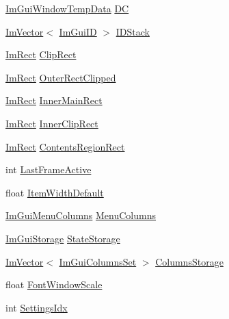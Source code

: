 \begin{DoxyCompactItemize}
\item 
\mbox{\hyperlink{struct_im_gui_window_temp_data}{Im\+Gui\+Window\+Temp\+Data}} \mbox{\hyperlink{struct_im_gui_window_a77e144869bf4ec6565893d9f7b7283eb}{DC}}
\item 
\mbox{\hyperlink{class_im_vector}{Im\+Vector}}$<$ \mbox{\hyperlink{imgui_8h_a1785c9b6f4e16406764a85f32582236f}{Im\+Gui\+ID}} $>$ \mbox{\hyperlink{struct_im_gui_window_a1a71724c43e37830ed9b38bd34f26917}{I\+D\+Stack}}
\item 
\mbox{\hyperlink{struct_im_rect}{Im\+Rect}} \mbox{\hyperlink{struct_im_gui_window_a9950a40b18de2579c4d3deb0ab33f455}{Clip\+Rect}}
\item 
\mbox{\hyperlink{struct_im_rect}{Im\+Rect}} \mbox{\hyperlink{struct_im_gui_window_ac3f0ac7cf4d8edb14a8e920e6831b4d8}{Outer\+Rect\+Clipped}}
\item 
\mbox{\hyperlink{struct_im_rect}{Im\+Rect}} \mbox{\hyperlink{struct_im_gui_window_af4ecf8f81236afac63696de62f903882}{Inner\+Main\+Rect}}
\item 
\mbox{\hyperlink{struct_im_rect}{Im\+Rect}} \mbox{\hyperlink{struct_im_gui_window_a5986bee1c08ff742a14c57e99ce6e7c8}{Inner\+Clip\+Rect}}
\item 
\mbox{\hyperlink{struct_im_rect}{Im\+Rect}} \mbox{\hyperlink{struct_im_gui_window_ac0d04b743eab132900c1ededc8eab9f6}{Contents\+Region\+Rect}}
\item 
int \mbox{\hyperlink{struct_im_gui_window_a6f3c194efabb4fd0a99be45fa5fe26f1}{Last\+Frame\+Active}}
\item 
float \mbox{\hyperlink{struct_im_gui_window_a5e6be361ee0c71a22a1ff68f6dbf09ff}{Item\+Width\+Default}}
\item 
\mbox{\hyperlink{struct_im_gui_menu_columns}{Im\+Gui\+Menu\+Columns}} \mbox{\hyperlink{struct_im_gui_window_a216bcecc3e90eb1c166d147bb6666322}{Menu\+Columns}}
\item 
\mbox{\hyperlink{struct_im_gui_storage}{Im\+Gui\+Storage}} \mbox{\hyperlink{struct_im_gui_window_a2151ab67f2624bd606883ad346179486}{State\+Storage}}
\item 
\mbox{\hyperlink{class_im_vector}{Im\+Vector}}$<$ \mbox{\hyperlink{struct_im_gui_columns_set}{Im\+Gui\+Columns\+Set}} $>$ \mbox{\hyperlink{struct_im_gui_window_ac2ad7437b8960be8182ffde0788e1ec6}{Columns\+Storage}}
\item 
float \mbox{\hyperlink{struct_im_gui_window_a566ce9268a466afbbec78532d5cfa3c9}{Font\+Window\+Scale}}
\item 
int \mbox{\hyperlink{struct_im_gui_window_add0518a4c1e784476a51f4d3af201e0f}{Settings\+Idx}}

\end{DoxyCompactItemize}
